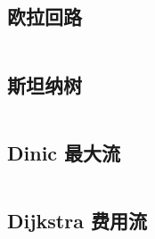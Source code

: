 \documentclass[titlepage, a4paper]{article}
\begin{document}
\begin{multicols}{2}
\begin{spacing}{0.6}
				\subsection{欧拉回路 \checkmark}
				\inputminted{cpp}{src/TreeandGraph/欧拉回路.cpp}
				\subsection{斯坦纳树}
				\inputminted{cpp}{src/TreeandGraph/斯坦纳树.cpp}
				\subsection{Dinic 最大流}
				\inputminted{cpp}{src/TreeandGraph/Dinic.cpp}
				\subsection{Dijkstra 费用流 \checkmark}
				\inputminted{cpp}{src/TreeandGraph/MCMF_dij.cpp}

\end{spacing}
\end{multicols}
\end{document}
